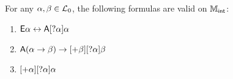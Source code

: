 \begin{proposition}
\label{exp_prop_dynamic_validities}
For any $\alpha, \beta \in \mathcal{L}_0$, the following formulas are valid
on $\mathbb{M}_{\mathsf{int}}$:

\begin{enumerate}
    \item\label{exp_item_exp_sndann} $\mathsf{E}\alpha \leftrightarrow \mathsf{A}[?\alpha]\alpha$

    \item\label{exp_item_weakening_sndann} $\mathsf{A}(\alpha \to \beta) \to
          [+\beta][?\alpha]\beta$

  \item\label{exp_item_weakening_sndann_eq} $[+\alpha][?\alpha]\alpha$

    \end{enumerate}
\end{proposition}

